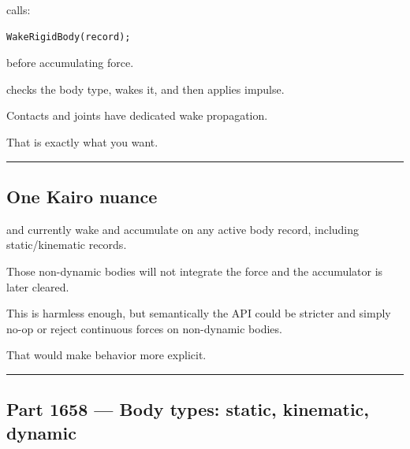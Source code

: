  calls:

\begin{verbatim}
WakeRigidBody(record);
\end{verbatim}

before accumulating force.

 checks the body type, wakes it, and then applies impulse.

Contacts and joints have dedicated wake propagation.

That is exactly what you want.

\begin{center}\rule{0.5\linewidth}{0.5pt}\end{center}

\subsection{One Kairo nuance}\label{06-engine-ii-ch037-one-kairo-nuance}

\hypertarget{06-engine-ii-ch037-one-kairo-nuance}{}

 and  currently wake and accumulate on any active body record, including static/kinematic records.

Those non-dynamic bodies will not integrate the force and the accumulator is later cleared.

This is harmless enough, but semantically the API could be stricter and simply no-op or reject continuous forces on non-dynamic bodies.

That would make behavior more explicit.

\begin{center}\rule{0.5\linewidth}{0.5pt}\end{center}

\subsection{Part 1658 --- Body types: static, kinematic, dynamic}\label{06-engine-ii-ch037-part-1658-body-types-static-kinematic-dynamic}

\hypertarget{06-engine-ii-ch037-part-1658-body-types-static-kinematic-dynamic}{}

